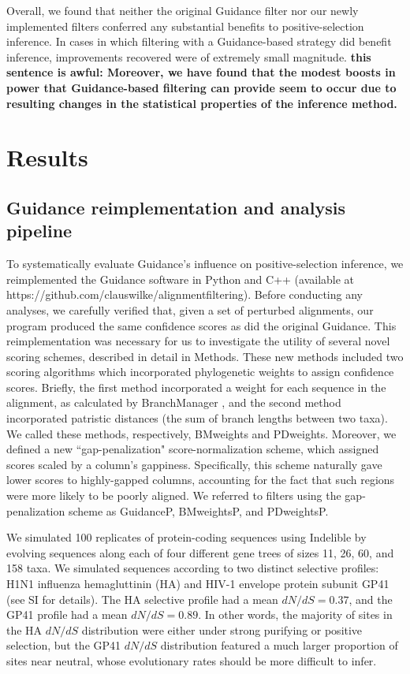 \documentclass[11pt]{article}
\begin{document}
Overall, we found that neither the original Guidance filter nor our newly implemented filters conferred any substantial benefits to positive-selection inference. In cases in which filtering with a Guidance-based strategy did benefit inference, improvements recovered were of extremely small magnitude. \textbf{this sentence is awful: Moreover, we have found that the modest boosts in power that Guidance-based filtering can provide seem to occur due to resulting changes in the statistical properties of the inference method.} 


\section*{Results}

\subsection*{Guidance reimplementation and analysis pipeline}
To systematically evaluate Guidance's influence on positive-selection inference, we reimplemented the Guidance software in Python and C++ (available at https://github.com/clauswilke/alignment\underline{\hspace*{0.2cm}}filtering). Before conducting any analyses, we carefully verified that, given a set of perturbed alignments, our program produced the same confidence scores as did the original Guidance. This reimplementation was necessary for us to investigate the utility of several novel scoring schemes, described in detail in Methods. These new methods included two scoring algorithms which incorporated phylogenetic weights to assign confidence scores. Briefly, the first method incorporated a weight for each sequence in the alignment, as calculated by BranchManager \citep{Stone2007}, and the second method incorporated patristic distances (the sum of branch lengths between two taxa). We called these methods, respectively, BMweights and PDweights. Moreover, we defined a new ``gap-penalization" score-normalization scheme, which assigned scores scaled by a column's gappiness. Specifically, this scheme naturally gave lower scores to highly-gapped columns, accounting for the fact that such regions were more likely to be poorly aligned. We referred to filters using the gap-penalization scheme as GuidanceP, BMweightsP, and PDweightsP.

We simulated 100 replicates of protein-coding sequences using Indelible \citep{Fletcher2009} by evolving sequences along each of four different gene trees of sizes 11, 26, 60, and 158 taxa. We simulated sequences according to two distinct selective profiles: H1N1 influenza hemagluttinin (HA) and HIV-1 envelope protein subunit GP41 (see SI for details). The HA selective profile had a mean $dN/dS = 0.37$, and the GP41 profile had a mean $dN/dS = 0.89$. In other words, the majority of sites in the HA $dN/dS$ distribution were either under strong purifying or positive selection, but the GP41 $dN/dS$ distribution featured a much larger proportion of sites near neutral, whose evolutionary rates should be more difficult to infer.  
\end{document}
